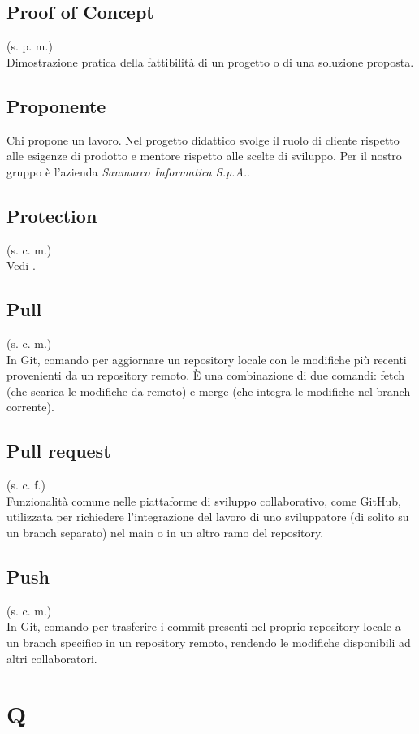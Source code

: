    \subsection{Proof of Concept}
    \label{Proof of Concept}
    (s. p. m.)\\
    Dimostrazione pratica della fattibilità di un progetto o di una soluzione proposta.
    \subsection{Proponente}
    \label{Proponente}
    Chi propone un lavoro. Nel progetto didattico svolge il ruolo di cliente 
    rispetto alle esigenze di prodotto e mentore rispetto alle scelte di sviluppo.
    Per il nostro gruppo è l'azienda \textit{Sanmarco Informatica S.p.A.}.
    \subsection{Protection}
    (s. c. m.)\\
    Vedi .
    \subsection{Pull}
    (s. c. m.)\\
    In Git, comando per aggiornare un repository locale con le modifiche più recenti provenienti 
    da un repository remoto. È una combinazione di due comandi: fetch (che scarica le modifiche 
    da remoto) e merge (che integra le modifiche nel branch corrente).
    \subsection{Pull request}
    (s. c. f.)\\
    Funzionalità comune nelle piattaforme di sviluppo collaborativo, come GitHub, utilizzata per 
    richiedere l'integrazione del lavoro di uno sviluppatore (di solito su un branch separato) 
    nel main o in un altro ramo del repository.
    \subsection{Push}
    (s. c. m.)\\
    In Git, comando per trasferire i commit presenti nel proprio repository locale a un 
    branch specifico in un repository remoto, rendendo le modifiche disponibili 
    ad altri collaboratori.

\pagebreak
\section{Q}
\pagebreak
